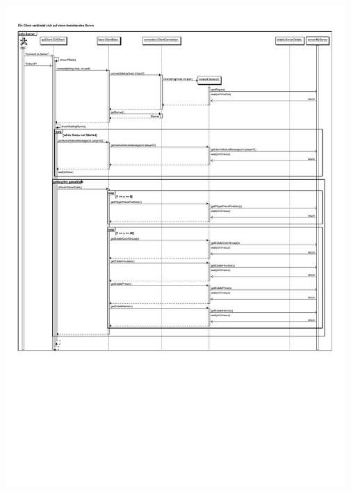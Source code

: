 \documentclass[a4paper,10pt]{article}
\begin{document}
\includegraphics[width=0.97\textwidth]{client_verbinden}
\end{document}
